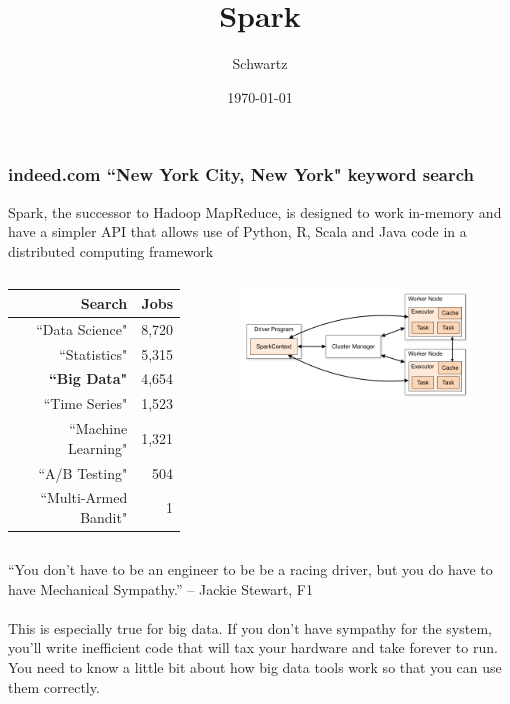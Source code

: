 \documentclass[xcolor={dvipsnames}]{beamer}
\title{Spark}
\author{Schwartz}
\date{\today}
\begin{document}
\frame{\titlepage}

\frame
{
\frametitle{indeed.com ``New York City, New York" keyword search}

Spark, the successor to Hadoop MapReduce, is designed to work
in-memory and have a simpler API that allows use of Python, R, Scala and Java code in a distributed computing framework 

\vspace{-.5em}

\noindent\makebox[\linewidth]{\rule{\paperwidth}{0.4pt}}

\vspace{-1em}

\begin{columns}

\begin{column}{.42\textwidth}

\footnotesize
\begin{table}
\begin{tabular}{|r|r|}
\hline
Search & Jobs \\\hline
``Data Science"& 8,720\\
``Statistics" & 5,315 \\
\textbf{``Big Data"} & 4,654\\
``Time Series" & 1,523\\
``Machine Learning"  & 1,321\\
``A/B Testing" & 504\\
``Multi-Armed Bandit" & 1\\\hline
\end{tabular}
\end{table}

\end{column}
\begin{column}{.65\textwidth}
\vspace{-1.25em}
\begin{figure}
\includegraphics[width=2.9in]{stuff/cluster-overview.png}
\end{figure}

\end{column}
\end{columns}

\noindent\makebox[\linewidth]{\rule{\paperwidth}{0.4pt}}

``You don't have to be an engineer to be be a racing driver, but you do have to have Mechanical Sympathy.'' -- Jackie Stewart, F1\\${}$\\

\scriptsize
This is especially true for big data. If you don't have sympathy for the system, you'll write inefficient code that will tax your hardware and take forever to run. You need to know a little bit about how big data tools work so that you can use them correctly.


}
\end{document}

